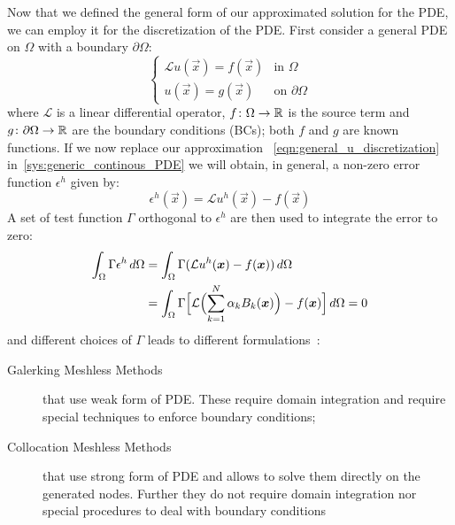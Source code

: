 Now that we defined the general form of our approximated solution for the PDE, we can employ it for the discretization of the PDE.
First consider a general PDE on $\Omega$ with a boundary $\partial\Omega$:
\begin{equation}
	\label{sys:generic_continous_PDE}
	\begin{cases}
		\mathcal{L} u(\vec{x})  = f(\vec{x})		& \text{in $\Omega$} \\
		u(\vec{x}) 							   = g(\vec{x})	 & \text{on $\partial\Omega$}
	\end{cases}
\end{equation}
where $\mathcal{L}$ is a linear differential operator, $f\colon\Omega\to\R$ is the source term and $g\colon\partial\Omega\to\R$ are the boundary conditions (BCs); both $f$ and $g$ are known functions. If  we now replace our approximation ~\eqref{eqn:general_u_discretization} in~\eqref{sys:generic_continous_PDE} we will obtain, in general, a non-zero error function $\epsilon^{h}$ given by:
\begin{equation}
	\epsilon^{h}(\vec{x}) = \mathcal{L} u^{h}(\vec{x}) - f(\vec{x})
\end{equation}
A set of test function $\Gamma$ orthogonal to $\epsilon^{h}$ are then used to integrate the error to zero:
\begin{equation}
	\begin{split}
		\int_{\Omega} \Gamma \epsilon^{h}\,d\Omega & = \int_{\Omega} \Gamma (\mathcal{L} u^{h}(\vec{x}) - f(\vec{x}))\,d\Omega  \\
		& = \int_{\Omega} \Gamma \Bigl[ \mathcal{L}\Bigl( \sum_{k= 1}^{N} {\alpha_k B_k(\vec{x})}\Bigr) - f(\vec{x})\Bigr]\,d\Omega = 0
	\end{split}
\end{equation}
and different choices of $\Gamma$ leads to different formulations~\cite{Chen:meshless_overview_after_20_years}:
\begin{description}
	\item[Galerking Meshless Methods] that use weak form of PDE. These require domain integration and require special techniques to enforce boundary conditions;
	\item[Collocation Meshless Methods] that use strong form of PDE and allows to solve them directly on the generated nodes. Further they do not require domain integration nor special procedures to deal with boundary conditions
\end{description}


